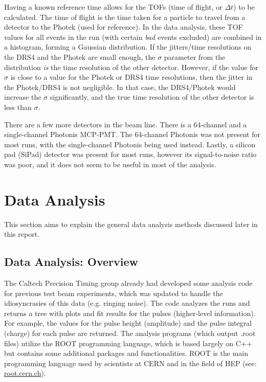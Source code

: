 \documentclass[twocolumn,aps,prd,reprint,superscriptaddress,floatfix]{revtex4-1}
\begin{document}
Having a known reference time allows for the TOFs (time of flight, or $\Delta t$) to be calculated. 
The time of flight is the time taken for a particle to travel from a detector to the Photek (used for reference). 
In the data analysis, these TOF values for all events in the run (with certain \textit{bad} events excluded) are combined in a histogram, forming a Gaussian distribution. 
If the jitters/time resolutions on the DRS4 and the Photek are small enough, the $\sigma$ parameter from the distribution \textit{is} the time resolution of the other detector.
However, if the value for $\sigma$ is close to a value for the Photek or DRS4 time resolutions, then the jitter in the Photek/DRS4 is not negligible.
In that case, the DRS4/Photek would increase the $\sigma$ significantly, and the true time resolution of the other detector is less than $\sigma$.

There are a few more detectors in the beam line.
There is a 64-channel and a single-channel Photonis MCP-PMT. 
The 64-channel Photonis was not present for most runs, with the single-channel Photonis being used instead. 
Lastly, a silicon pad (SiPad) detector was present for most runs, however its signal-to-noise ratio was poor, and it does not seem to be useful in most of the analysis.

\section{Data Analysis}
This section aims to explain the general data analysis methods discussed later in this report.

\subsection{Data Analysis: Overview}
The Caltech Precision Timing group already had developed some analysis code for previous test beam experiments, which was updated to handle the idiosyncrasies of this data (e.g. ringing noise). 
The code analyzes the runs and returns a tree with plots and fit results for the pulses (higher-level information).
For example, the values for the pulse height (amplitude) and the pulse integral (charge) for each pulse are returned.
The analysis programs (which output .root files) utilize the ROOT programming language, which is based largely on C++ but contains some additional packages and functionalities. 
ROOT is the main programming language used by scientists at CERN and in the field of HEP (see: \href{root.cern.ch}{root.cern.ch}).
\end{document}
